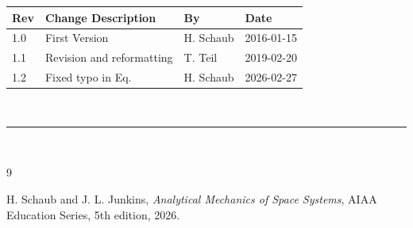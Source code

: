 \documentclass[]{BasiliskReportMemo}
\begin{document}
\makeCover

%
%
\pagestyle{empty}
{\renewcommand{\arraystretch}{2}
\noindent
\begin{longtable}{|p{0.5in}|p{3.5in}|p{1.07in}|p{0.9in}|}
\hline
{\bfseries Rev} & {\bfseries Change Description} & {\bfseries By}& {\bfseries Date} \\
\hline
1.0 & First Version & H. Schaub & 2016-01-15\\
\hline
1.1 & Revision and reformatting & T. Teil & 2019-02-20\\
\hline
1.2 & Fixed typo in Eq.  & H. Schaub & 2026-02-27\\
\hline

\end{longtable}
}



\newpage
\setcounter{page}{1}
\pagestyle{fancy}

\tableofcontents %
~\\ \hrule ~\\ %




















\begin{thebibliography}{9}

H. Schaub and J. L. Junkins,
\textit{Analytical Mechanics of Space Systems},
AIAA Education Series, 5th edition, 2026.


\end{thebibliography}
\end{document}
